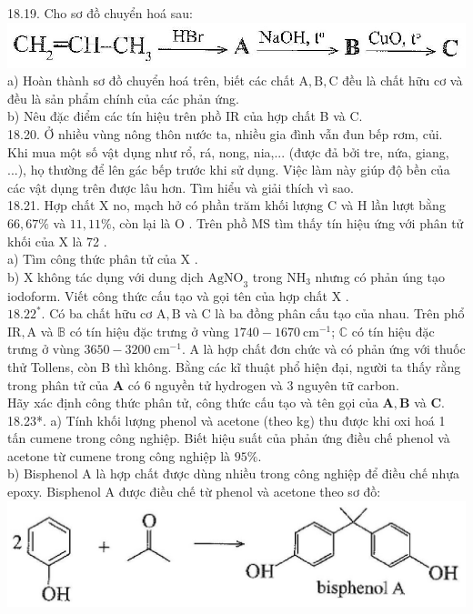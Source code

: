 \documentclass[10pt]{article}
\begin{document}
18.19. Cho sơ đồ chuyển hoá sau:\\
\includegraphics[max width=\textwidth, center]{2025_10_23_f2823ef970776205e47bg-57(1)}\\
a) Hoàn thành sơ đồ chuyển hoá trên, biết các chất $\mathrm{A}, \mathrm{B}, \mathrm{C}$ đều là chất hữu cơ và đều là sản phẩm chính của các phản ứng.\\
b) Nêu đặc điểm các tín hiệu trên phồ IR của hợp chất B và C.\\
18.20. Ở nhiều vùng nông thôn nước ta, nhiều gia đình vẫn đun bếp rơm, củi. Khi mua một số vật dụng như rổ, rá, nong, nia,... (được đả bởi tre, nứa, giang, ...), họ thường để lên gác bếp trước khi sử dụng. Việc làm này giúp độ bền của các vật dụng trên được lâu hơn. Tìm hiểu và giải thích vì sao.\\
18.21. Hợp chất X no, mạch hở có phần trăm khối lượng C và H lần lượt bằng $66,67 \%$ và $11,11 \%$, còn lại là O . Trên phồ MS tìm thấy tín hiệu ứng với phân tử khối của X là 72 .\\
a) Tìm công thức phân tử của X .\\
b) X không tác dụng với dung dịch $\mathrm{AgNO}_{3}$ trong $\mathrm{NH}_{3}$ nhưng có phản úng tạo iodoform. Viết công thức cấu tạo và gọi tên của hợp chất X .\\
$18.22^{*}$. Có ba chất hữu cơ $\mathrm{A}, \mathrm{B}$ và C là ba đồng phân cấu tạo của nhau. Trên phổ $\mathrm{IR}, \mathrm{A}$ và $\mathbb{B}$ có tín hiệu đặc trưng ở vùng $1740-1670 \mathrm{~cm}^{-1}$; $\mathbb{C}$ có tín hiệu đặc trưng ở vùng $3650-3200 \mathrm{~cm}^{-1}$. A là hợp chất đơn chức và có phản ứng với thuốc thử Tollens, còn B thì không. Bằng các kĩ thuật phổ hiện đại, người ta thấy rằng trong phân tử của $\mathbf{A}$ có 6 nguyền tử hydrogen và 3 nguyên tữ carbon.\\
Hãy xác định công thức phân tử, công thức cấu tạo và tên gọi của $\mathbf{A}, \mathbf{B}$ và $\mathbf{C}$.\\
18.23*. a) Tính khối lượng phenol và acetone (theo kg) thu được khi oxi hoá 1 tấn cumene trong công nghiệp. Biết hiệu suất của phản ứng điều chế phenol và acetone từ cumene trong công nghiệp là $95 \%$.\\
b) Bisphenol A là hợp chất được dùng nhiều trong công nghiệp để điều chế nhựa epoxy. Bisphenol A được điều chế từ phenol và acetone theo sơ đồ:\\
\includegraphics[max width=\textwidth, center]{2025_10_23_f2823ef970776205e47bg-57}
\end{document}
